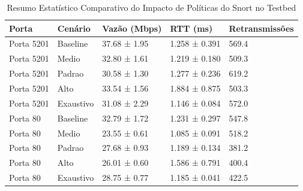 \begin{table}
\caption{Resumo Estatístico Comparativo do Impacto de Políticas do Snort no Testbed}
\label{tab:resultado_snort}
\begin{tabular}{lllll}
\toprule
Porta & Cenário & Vazão (Mbps) & RTT (ms) & Retransmissões \\
\midrule
Porta 5201 & Baseline & 37.68 ± 1.95 & 1.258 ± 0.391 & 569.4 \\
Porta 5201 & Medio & 32.80 ± 1.61 & 1.219 ± 0.180 & 509.3 \\
Porta 5201 & Padrao & 30.58 ± 1.30 & 1.277 ± 0.236 & 619.2 \\
Porta 5201 & Alto & 33.54 ± 1.56 & 1.884 ± 0.875 & 503.3 \\
Porta 5201 & Exaustivo & 31.08 ± 2.29 & 1.146 ± 0.084 & 572.0 \\
Porta 80 & Baseline & 32.79 ± 1.72 & 1.231 ± 0.297 & 547.8 \\
Porta 80 & Medio & 23.55 ± 0.61 & 1.085 ± 0.091 & 518.2 \\
Porta 80 & Padrao & 27.68 ± 0.93 & 1.189 ± 0.134 & 381.2 \\
Porta 80 & Alto & 26.01 ± 0.60 & 1.586 ± 0.791 & 400.4 \\
Porta 80 & Exaustivo & 28.75 ± 0.77 & 1.185 ± 0.041 & 422.5 \\
\bottomrule
\end{tabular}
\end{table}
